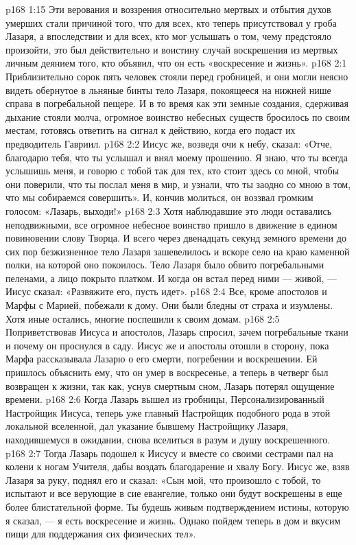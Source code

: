 \vs p168 1:15 Эти верования и воззрения относительно мертвых и отбытия духов умерших стали причиной того, что для всех, кто теперь присутствовал у гроба Лазаря, а впоследствии и для всех, кто мог услышать о том, чему предстояло произойти, это был действительно и воистину случай воскрешения из мертвых личным деянием того, кто объявил, что он есть «воскресение и жизнь».
\vs p168 2:1 Приблизительно сорок пять человек стояли перед гробницей, и они могли неясно видеть обернутое в льняные бинты тело Лазаря, покоящееся на нижней нише справа в погребальной пещере. И в то время как эти земные создания, сдерживая дыхание стояли молча, огромное воинство небесных существ бросилось по своим местам, готовясь ответить на сигнал к действию, когда его подаст их предводитель Гавриил.
\vs p168 2:2 Иисус же, возведя очи к небу, сказал: «Отче, благодарю тебя, что ты услышал и внял моему прошению. Я знаю, что ты всегда услышишь меня, и говорю с тобой так для тех, кто стоит здесь со мной, чтобы они поверили, что ты послал меня в мир, и узнали, что ты заодно со мною в том, что мы собираемся совершить». И, кончив молиться, он воззвал громким голосом: «Лазарь, выходи!»
\vs p168 2:3 Хотя наблюдавшие это люди оставались неподвижными, все огромное небесное воинство пришло в движение в едином повиновении слову Творца. И всего через двенадцать секунд земного времени до сих пор безжизненное тело Лазаря зашевелилось и вскоре село на краю каменной полки, на которой оно покоилось. Тело Лазаря было обвито погребальными пеленами, а лицо покрыто платком. И когда он встал перед ними --- живой, --- Иисус сказал: «Развяжите его, пусть идет».
\vs p168 2:4 Все, кроме апостолов и Марфы с Марией, побежали к дому. Они были бледны от страха и изумлены. Хотя иные остались, многие поспешили к своим домам.
\vs p168 2:5 Поприветствовав Иисуса и апостолов, Лазарь спросил, зачем погребальные ткани и почему он проснулся в саду. Иисус же и апостолы отошли в сторону, пока Марфа рассказывала Лазарю о его смерти, погребении и воскрешении. Ей пришлось объяснить ему, что он умер в воскресенье, а теперь в четверг был возвращен к жизни, так как, уснув смертным сном, Лазарь потерял ощущение времени.
\vs p168 2:6 \pc Когда Лазарь вышел из гробницы, Персонализированный Настройщик Иисуса, теперь уже главный Настройщик подобного рода в этой локальной вселенной, дал указание бывшему Настройщику Лазаря, находившемуся в ожидании, снова вселиться в разум и душу воскрешенного.
\vs p168 2:7 \pc Тогда Лазарь подошел к Иисусу и вместе со своими сестрами пал на колени к ногам Учителя, дабы воздать благодарение и хвалу Богу. Иисус же, взяв Лазаря за руку, поднял его и сказал: «Сын мой, что произошло с тобой, то испытают и все верующие в сие евангелие, только они будут воскрешены в еще более блистательной форме. Ты будешь живым подтверждением истины, которую я сказал, --- я есть воскресение и жизнь. Однако пойдем теперь в дом и вкусим пищи для поддержания сих физических тел».
